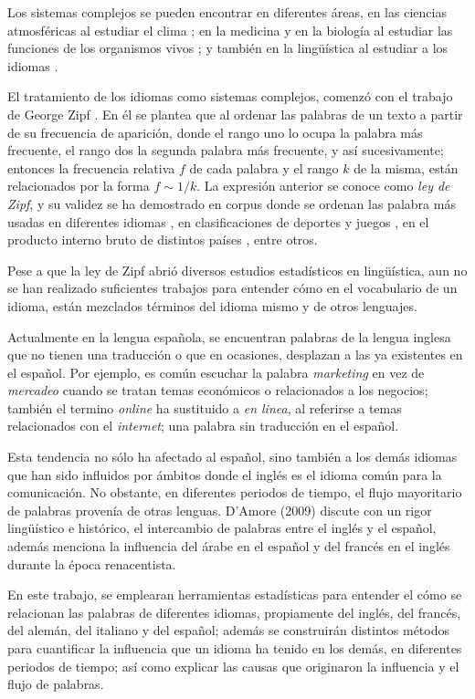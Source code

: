 Los sistemas complejos se pueden encontrar en diferentes áreas, en las ciencias atmosféricas al estudiar el clima \cite{complex_climate};  en la medicina y en la biología al estudiar las funciones de los organismos vivos  \cite{complex_medicine}; y también en la lingüística al estudiar a los idiomas  \cite{complex_language}.

El tratamiento de los idiomas como sistemas complejos, comenzó con el trabajo de George Zipf \cite{zipf}. En él se plantea que al ordenar las palabras de un texto a partir de su frecuencia de aparición, donde el rango uno lo ocupa la palabra más frecuente, el rango dos la segunda palabra más frecuente, y así sucesivamente; entonces la frecuencia relativa $f$ de cada palabra y el rango $k$ de la misma, están relacionados por la forma $f\sim1/k$. La expresión anterior se conoce como \textit{ley de Zipf}, y su validez se ha demostrado en corpus donde se ordenan las palabra más usadas en diferentes idiomas \cite{tesis.sergio}, en clasificaciones de deportes y juegos \cite{epj}, en el producto interno bruto de distintos países \cite{zipf_gdp}, entre otros. 

Pese a que la ley de Zipf abrió diversos estudios estadísticos en lingüística, aun no se han realizado suficientes trabajos para entender cómo en el vocabulario de un idioma, están mezclados términos del idioma mismo y de otros lenguajes. 

Actualmente en la lengua española, se encuentran palabras de la lengua inglesa que no tienen una traducción o que en ocasiones, desplazan a las ya existentes en el español. Por ejemplo, es común escuchar la palabra \textit{marketing} en vez de \textit{mercadeo} cuando se tratan temas económicos o relacionados a los negocios; también el termino \textit{online} ha sustituido a \textit{en linea}, al referirse a temas relacionados con el \textit{internet}; una palabra sin traducción en el español. 

Esta tendencia no sólo ha afectado al español, sino también a los demás idiomas que han sido influidos por ámbitos donde el inglés es el idioma común para la comunicación.  No obstante,  en diferentes periodos de tiempo, el flujo mayoritario de palabras provenía de otras lenguas. D'Amore (2009) \cite{influencia_mutua} discute con un rigor lingüístico e histórico, el intercambio de palabras entre el inglés y el español, además menciona la influencia del árabe en el español y del francés en el inglés durante la época renacentista.  

En este trabajo, se emplearan herramientas estadísticas para entender el cómo se relacionan las palabras de diferentes idiomas, propiamente del inglés, del francés, del alemán, del italiano y del español;  además se construirán distintos métodos para cuantificar la influencia que un idioma ha tenido en los demás, en diferentes periodos de tiempo; así como explicar las causas que originaron la influencia y el flujo de palabras. 




